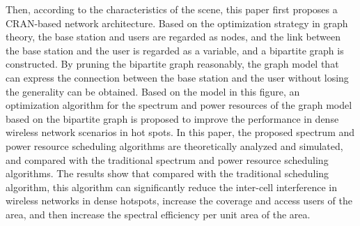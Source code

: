 {Then, according to the characteristics of the scene, this paper first proposes a CRAN-based network architecture. Based on the optimization strategy in graph theory, the base station and users are regarded as nodes, and the link between the base station and the user is regarded as a variable, and a bipartite graph is constructed.
By pruning the bipartite graph reasonably, the graph model that can express the connection between the base station and the user without losing the generality can be obtained.
Based on the model in this figure, an optimization algorithm for the spectrum and power resources of the graph model based on the bipartite graph is proposed to improve the performance in dense wireless network scenarios in hot spots.
In this paper, the proposed spectrum and power resource scheduling algorithms are theoretically analyzed and simulated, and compared with the traditional spectrum and power resource scheduling algorithms.
The results show that compared with the traditional scheduling algorithm, this algorithm can significantly reduce the inter-cell interference in wireless networks in dense hotspots, increase the coverage and access users of the area, and then increase the spectral efficiency per unit area of ​​the area.
}



\makecover
\clearpage

